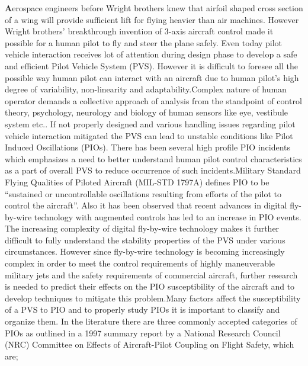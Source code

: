 \doublespacing
\par \lettrine[lraise=0.3,loversize=1]{\textbf{A}}{}erospace engineers before Wright brothers knew that airfoil shaped cross section of a wing will provide sufficient lift for flying heavier than air machines. However Wright brothers' breakthrough invention of 3-axis aircraft control made it possible for a human pilot to fly and steer the plane safely\cite{birthofflightcontrol}. Even today pilot vehicle interaction receives lot of attention during design phase to develop a safe and efficient Pilot Vehicle System (PVS). However it is difficult to foresee all the possible way human pilot can interact with an aircraft due to human pilot's high degree of variability, non-linearity and adaptability.Complex nature of human operator demands a collective approach of analysis from the standpoint of control theory, psychology, neurology and biology of human sensors like eye, vestibule system etc.\cite{mcruer1965human}\cite{mcruer1969theory}\cite{hosman1999pilot}. If not properly designed and various handling issues regarding pilot vehicle interaction mitigated the PVS can lead to unstable conditions like Pilot Induced Oscillations (PIOs)\cite{McRuerPIO}. There has been several high profile PIO incidents\cite{SAABPIO}\cite{YF22} which emphasizes a need to better understand human pilot control characteristics as a part of overall PVS to reduce occurrence of such incidents.Military Standard Flying Qualities of Piloted Aircraft (MIL-STD 1797A)\cite{MLSTD} defines PIO to be “sustained or uncontrollable oscillations resulting from efforts of the pilot to control the aircraft”. Also it has been observed that recent advances in digital fly-by-wire technology with augmented controls has led to an increase in PIO events\cite{BoeingPIO}\cite{Norton}\cite{hoh1982bandwidth}\cite{hess1991technique}\cite{green1986design}. The increasing complexity of digital fly-by-wire technology makes it  further difficult to fully understand the stability properties of the PVS under various circumstances. However since fly-by-wire technology is becoming increasingly complex in order to meet the control requirements of highly maneuverable military jets and the safety requirements of commercial aircraft, further research is needed to predict their effects on the PIO susceptibility of the aircraft and to develop techniques to mitigate this problem.Many factors affect the susceptibility of a PVS to PIO and to properly study PIOs it is important to classify and organize them. In the literature there are three commonly accepted categories of PIOs as outlined in a 1997 summary report by a National Research Council (NRC) Committee on Effects of Aircraft-Pilot Coupling on Flight Safety\cite{mcruer1997aviation}, which are;\\
